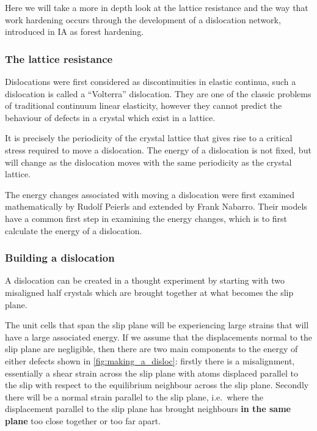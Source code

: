  
Here we will take a more in depth look at the lattice resistance and the way that work hardening occurs through the development of a dislocation network, introduced in IA as forest hardening.
\FloatBarrier

\subsubsection{The lattice resistance}

Dislocations were first considered as discontinuities in elastic continua, such a dislocation is called a ``Volterra'' dislocation. They are one of the classic problems of traditional continuum linear elasticity, however they cannot predict the behaviour of defects in a crystal which exist in a lattice.

It is precisely the periodicity of the crystal lattice that gives rise to a critical stress required to move a dislocation. The energy of a dislocation is not fixed, but will change as the dislocation moves with the same periodicity as the crystal lattice.

The energy changes associated with moving a dislocation were first examined mathematically by Rudolf Peierls and extended by Frank Nabarro. Their models have a common first step in examining the energy changes, which is to first calculate the energy of a dislocation.

\subsubsection*{Building a dislocation}
A dislocation can be created in a thought experiment by starting with two misaligned half crystals which are brought together at what becomes the slip plane.

The unit cells that span the slip plane will be experiencing large strains that will have a large associated energy. If we assume that the displacements normal to the slip plane are negligible, then there are two main components to the energy of either defects shown in \autoref{fig:making_a_disloc}: firstly there is a misalignment, essentially a shear strain across the slip plane with atoms displaced parallel to the slip with respect to the equilibrium neighbour across the slip plane. Secondly there will be a normal strain parallel to the slip plane, i.e.\ where the displacement parallel to the slip plane has brought neighbours {\bf in the same plane} too close together or too far apart.


